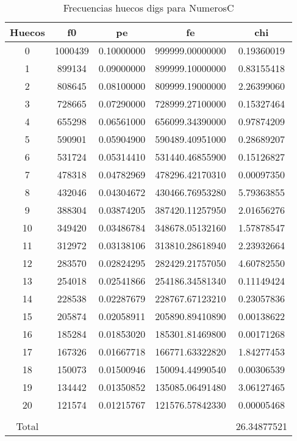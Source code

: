 \documentclass[a4paper]{article}
\begin{document}
\begin{table}
\centering
\begin{tabular}{ccccc}
\\\hline
Huecos&f0&pe&fe&chi\\\hline
0&1000439&0.10000000&999999.00000000&0.19360019\\
1&899134&0.09000000&899999.10000000&0.83155418\\
2&808645&0.08100000&809999.19000000&2.26399060\\
3&728665&0.07290000&728999.27100000&0.15327464\\
4&655298&0.06561000&656099.34390000&0.97874209\\
5&590901&0.05904900&590489.40951000&0.28689207\\
6&531724&0.05314410&531440.46855900&0.15126827\\
7&478318&0.04782969&478296.42170310&0.00097350\\
8&432046&0.04304672&430466.76953280&5.79363855\\
9&388304&0.03874205&387420.11257950&2.01656276\\
10&349420&0.03486784&348678.05132160&1.57878547\\
11&312972&0.03138106&313810.28618940&2.23932664\\
12&283570&0.02824295&282429.21757050&4.60782550\\
13&254018&0.02541866&254186.34581340&0.11149424\\
14&228538&0.02287679&228767.67123210&0.23057836\\
15&205874&0.02058911&205890.89410890&0.00138622\\
16&185284&0.01853020&185301.81469800&0.00171268\\
17&167326&0.01667718&166771.63322820&1.84277453\\
18&150073&0.01500946&150094.44990540&0.00306539\\
19&134442&0.01350852&135085.06491480&3.06127465\\
20&121574&0.01215767&121576.57842330&0.00005468\\
\\\hline
Total & & & &26.34877521\\\hline
\end{tabular}
\caption{\label{tab:frechuecosdigsNumerosC}Frecuencias huecos digs para NumerosC}
\end{table}
\end{document}
